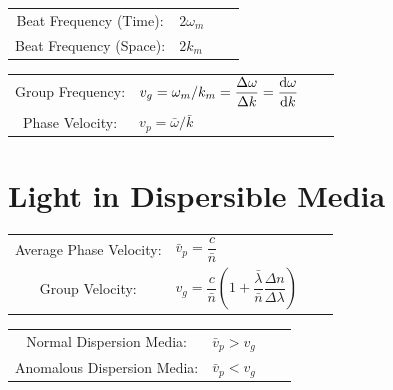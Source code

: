 \begin{table}[h]
  \centering
  \begin{tabular}{Sl Sl}
    Beat Frequency (Time): & $2 \omega_m $ \\
    Beat Frequency (Space): & $ 2 k_m $ \\
  \end{tabular}
  \quad\quad\quad\quad
  \begin{tabular}{Sl Sl}
    Group Frequency: & $v_g = \omega_m / k_m = \dfrac{\Delta \omega}{\Delta k} = \dfrac{\mathop{}\!\mathrm{d} \omega}{\mathop{}\!\mathrm{d} k}   $ \\
    Phase Velocity: & $ v_p = \bar{\omega} / \bar{k}$ \\
  \end{tabular}
\end{table}

\section{Light in Dispersible Media}

\begin{table}[h]
  \centering
  \begin{tabular}{Sl Sl}
    Average Phase Velocity: & $\bar{v}_p = \dfrac{c}{\bar{n}} $ \\
    Group Velocity: & $v_g = \dfrac{c}{\bar{n}} \left( 1 + \dfrac{\bar{\lambda}}{\bar{n}} \dfrac{\Delta n}{\Delta \lambda}   \right) $ \\
  \end{tabular}
  \quad\quad\quad\quad
  \begin{tabular}{Sl Sl}
    Normal Dispersion Media: & $\bar{v}_p > v_g $ \\
    Anomalous Dispersion Media: & $ \bar{v}_p < v_g $ \\
  \end{tabular}
\end{table}


